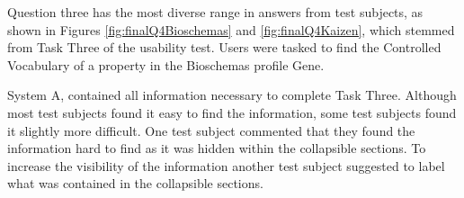 Question three has the most diverse range in answers from test subjects, as shown in Figures \ref{fig:finalQ4Bioschemas} and \ref{fig:finalQ4Kaizen}, which stemmed from Task Three of the usability test. Users were tasked to find the Controlled Vocabulary of a property in the Bioschemas profile Gene.

System A, contained all information necessary to complete Task Three. Although most test subjects found it easy to find the information, some test subjects found it slightly more difficult. One test subject commented that they found the information hard to find as it was hidden within the collapsible sections. To increase the visibility of the information another test subject suggested to label what was contained in the collapsible sections.

